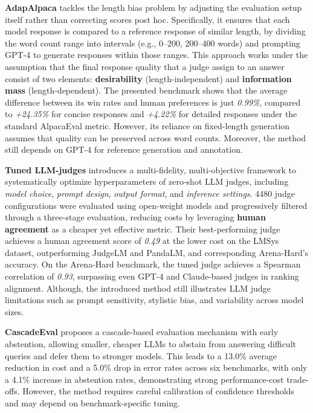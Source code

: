 \documentclass[sigconf, authoryear]{acmart}
\begin{document}
\textbf{AdapAlpaca} tackles the length bias problem by adjusting the evaluation setup itself rather than correcting scores post hoc.
Specifically, it ensures that each model response is compared to a reference response of similar length, by dividing the word count range into intervals (e.g., 0–200, 200–400 words) and prompting GPT-4 to generate responses within those ranges.
This approach works under the assumption that the final response quality that a judge assign to an answer consist of two elements: \textbf{desirability} (length-independent) and \textbf{information mass} (length-dependent).
The presented benchmark shows that the average difference between its win rates and human preferences is just \textit{0.99\%}, compared to \textit{+24.35\%} for concise responses and \textit{+4.22\%} for detailed responses under the standard AlpacaEval metric.
However, its reliance on fixed-length generation assumes that quality can be preserved across word counts.
Moreover, the method still depends on GPT-4 for reference generation and annotation\cite{hu2024explaininglengthbiasllmbased}.

\textbf{Tuned LLM-judges} introduces a multi-fidelity, multi-objective framework to systematically optimize hyperparameters of zero-shot LLM judges, including \textit{model choice}, \textit{prompt design}, \textit{output format}, and \textit{inference settings}.
4480 judge configurations were evaluated using open-weight models and progressively filtered through a three-stage evaluation, reducing costs by leveraging \textbf{human agreement} as a cheaper yet effective metric.
Their best-performing judge achieves a human agreement score of \textit{0.49} at the lower cost on the LMSys dataset, outperforming JudgeLM and PandaLM, and corresponding Arena-Hard’s accuracy.
On the Arena-Hard benchmark, the tuned judge achieves a Spearman correlation of \textit{0.93}, surpassing even GPT-4 and Claude-based judges in ranking alignment.
Although, the introduced method still illustrates LLM judge limitations such as prompt sensitivity, stylistic bias, and variability across model sizes\cite{salinas2025tuningllmjudgedesign}.

\textbf{CascadeEval} proposes a cascade-based evaluation mechanism with early abstention, allowing smaller, cheaper LLMs to abstain from answering difficult queries and defer them to stronger models.
This leads to a 13.0\% average reduction in cost and a 5.0\% drop in error rates across six benchmarks, with only a 4.1\% increase in abstention rates, demonstrating strong performance-cost trade-offs.
However, the method requires careful calibration of confidence thresholds and may depend on benchmark-specific tuning\cite{cascade_eval}.
\end{document}
